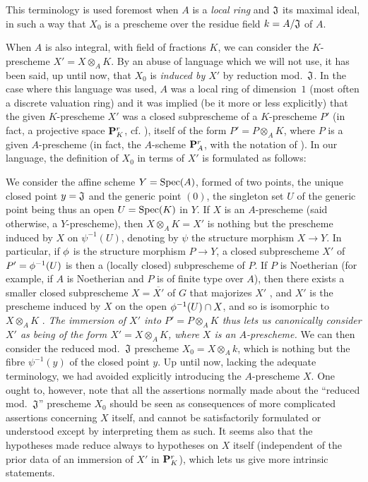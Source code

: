 \begin{env}
\label{1.3.7.2}
This terminology is used foremost when $A$ is a \emph{local ring} and $\mathfrak{J}$ its maximal ideal, in such a way that $X_0$ is a prescheme over the residue field $k=A/\mathfrak{J}$ of $A$.

When $A$ is also integral, with field of fractions $K$, we can consider the $K$-prescheme $X'=X\otimes_A K$.
By an abuse of language which we will not use, it has been said, up until now, that $X_0$ is \emph{induced by $X'$} by reduction mod.~$\mathfrak{J}$.
In the case where this language was used, $A$ was a local ring of dimension~$1$ (most often a discrete valuation ring) and it was implied (be it more or less explicitly) that the given $K$-prescheme $X'$ was a closed subprescheme of a $K$-prescheme $P'$ (in fact, a projective space  $\mathbf{P}_K^r$, cf. ), itself of the form $P'=P\otimes_A K$, where $P$ is a given $A$-prescheme (in fact, the $A$-scheme $\mathbf{P}_A^r$, with the notation of ).
In our language, the definition of $X_0$ in terms of $X'$ is formulated as follows:

We consider the affine scheme $Y={\mathop{\mathrm{Spec}}\nolimits}(A)$, formed of two points, the unique closed point
$y=\mathfrak{J}$ and the generic point $(0)$, the singleton set $U$ of the generic point being thus an open $U={\mathop{\mathrm{Spec}}\nolimits}(K)$ in $Y$.
If $X$ is an $A$-prescheme (said otherwise, a $Y$-prescheme), then $X\otimes_A K=X'$ is nothing but the prescheme induced by $X$ on $\psi^{-1}(U)$, denoting by $\psi$ the structure morphism $X\to Y$.
In particular, if $\phi$ is the structure morphism $P\to Y$, a closed subprescheme $X'$ of $P'=\phi^{-1}(U)$ is then a (locally closed) subprescheme of $P$.
If $P$ is Noetherian (for example, if $A$ is Noetherian and $P$ is of finite type over $A$), then there exists a smaller closed subprescheme $X=\overline{X'}$ of $G$ that majorizes $X'$ , and $X'$ is the prescheme induced by $X$ on the open $\phi^{-1}(U)\cap X$, and so is isomorphic to $X\otimes_A K$ .
\emph{The immersion of $X'$ into $P'=P\otimes_A K$ thus lets us canonically consider $X'$ as being of the form $X'=X\otimes_A K$, where $X$ is an $A$-prescheme.}
We can then consider the reduced mod.~$\mathfrak{J}$ prescheme $X_0=X\otimes_A k$, which is nothing but the fibre $\psi^{-1}(y)$ of the closed point $y$.
Up until now, lacking the adequate terminology, we had avoided explicitly introducing the $A$-prescheme $X$.
One ought to, however, note that all the assertions normally made about the ``reduced mod.~$\mathfrak{J}$'' prescheme  $X_0$ should be seen as consequences of more complicated assertions concerning $X$ itself, and cannot be satisfactorily formulated or understood except by interpreting them as such.
It seems also that the hypotheses made reduce always to hypotheses on $X$ itself (independent of the prior data of an immersion of $X'$ in $\mathbf{P}_K^r$), which lets us give more intrinsic statements.
\end{env}

